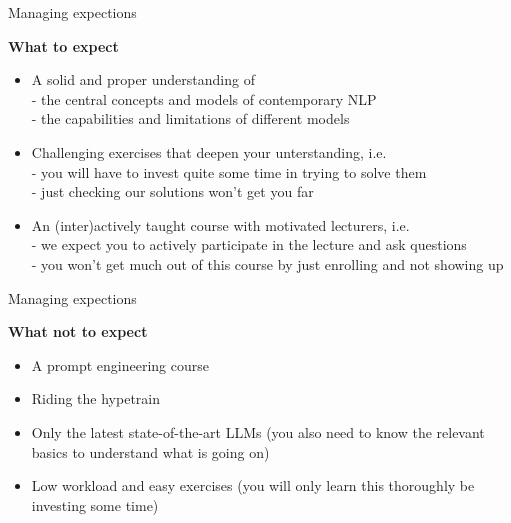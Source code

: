 \documentclass[11pt,compress,t,notes=noshow, xcolor=table]{beamer}
\begin{document}
\begin{frame}{Managing expections}

\vfill

\textbf{What to expect}

	\begin{itemize}
		\item A solid and proper understanding of\\
		- the central concepts and models of contemporary NLP\\
		- the capabilities and limitations of different models
		\item Challenging exercises that deepen your unterstanding, i.e.\\
		- you will have to invest quite some time in trying to solve them\\
		- just checking our solutions won't get you far
		\item An (inter)actively taught course with motivated lecturers, i.e.\\
		- we expect you to actively participate in the lecture and ask questions\\
		- you won't get much out of this course by just enrolling and not showing up
	\end{itemize}


\vfill

\end{frame}


\begin{frame}{Managing expections}

\vfill

\textbf{What not to expect}

	\begin{itemize}
		\item A prompt engineering course
		\item Riding the hypetrain
		\item Only the latest state-of-the-art LLMs (you also need to know the relevant basics to understand what is going on)
		\item Low workload and easy exercises (you will only learn this thoroughly be investing some time)
	\end{itemize}

\vfill

\end{frame}

\end{document}
